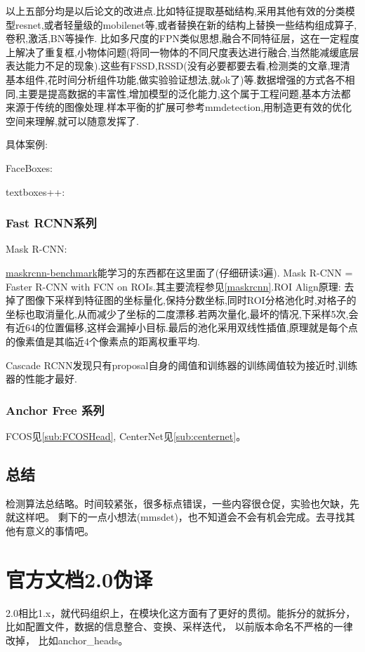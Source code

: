 \documentclass[UTF8]{ctexart}
\begin{document}
以上五部分均是以后论文的改进点.比如特征提取基础结构,采用其他有效的分类模型resnet,或者轻量级的mobilenet等,或者替换在新的结构上替换一些结构组成算子,卷积,激活,BN等操作. 比如多尺度的FPN类似思想,融合不同特征层，这在一定程度上解决了重复框,小物体问题(将同一物体的不同尺度表达进行融合,当然能减缓底层表达能力不足的现象).这些有FSSD,RSSD(没有必要都要去看,检测类的文章,理清基本组件,花时间分析组件功能,做实验验证想法,就ok了)等.数据增强的方式各不相同,主要是提高数据的丰富性,增加模型的泛化能力,这个属于工程问题,基本方法都来源于传统的图像处理.样本平衡的扩展可参考mmdetection,用制造更有效的优化空间来理解,就可以随意发挥了.

具体案例:

FaceBoxes:

textboxes++:


\subsubsection{Fast RCNN系列}
Mask R-CNN:

\href{https://github.com/facebookresearch/maskrcnn-benchmark}{maskrcnn-benchmark}能学习的东西都在这里面了(仔细研读3遍). 
Mask R-CNN = Faster R-CNN  with FCN on ROIs.其主要流程参见\ref{maskrcnn}.ROI Align原理:
去掉了图像下采样到特征图的坐标量化,保持分数坐标,同时ROI分格池化时,对格子的坐标也取消量化,从而减少了坐标的二度漂移.若两次量化,最坏的情况,下采样5次,会有近64的位置偏移,这样会漏掉小目标.最后的池化采用双线性插值,原理就是每个点的像素值是其临近4个像素点的距离权重平均.

Cascade RCNN发现只有proposal自身的阈值和训练器的训练阈值较为接近时,训练器的性能才最好.
\subsubsection{Anchor Free 系列}
FCOS见\ref{sub:FCOSHead}, CenterNet见\ref{sub:centernet}。

\subsection{总结}

检测算法总结略。时间较紧张，很多标点错误，一些内容很仓促，实验也欠缺，先就这样吧。
剩下的一点小想法(mmsdet)，也不知道会不会有机会完成。去寻找其他有意义的事情吧。



\section{官方文档2.0伪译}
2.0相比1.x，就代码组织上，在模块化这方面有了更好的贯彻。能拆分的就拆分，比如配置文件，数据的信息整合、变换、采样迭代，
以前版本命名不严格的一律改掉， 比如anchor\_heads。
\end{document}
